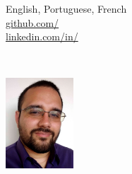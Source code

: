 


\begin{minipage}{\dimexpr(\textwidth-1.2in)}
  \begin{minipage}{.35\linewidth}
    \faPhone \enspace \phone \\
    \faEnvelope \enspace \href{mailto:\email}{\email} \\
    \faLanguage \enspace English, Portuguese, French \\
    \faGithub \enspace \href{https://github.com/\github}{github.com/\github} \\
    \faLinkedin \enspace \href{https://www.linkedin.com/in/\LinkedIn}{linkedin.com/in/\LinkedIn}
    \smallskip
  \end{minipage}
  \begin{minipage}{.65\linewidth}
    \centering
    {\Huge \skills \name} \\
    {\color{highlight} \Large{\role}} \vspace{2em} %
  \end{minipage}
  {\color{highlight}\hrulefill}
  
\end{minipage}
\begin{minipage}{1.1in}
  \centering \includegraphics[width=1in]{photo}
\end{minipage}
